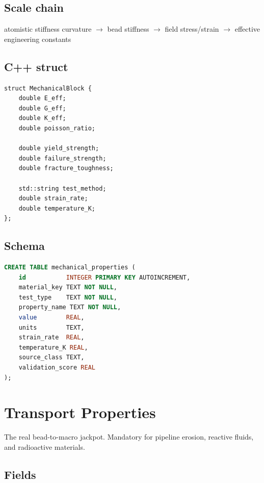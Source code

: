\documentclass[11pt, a4paper]{article}
\begin{document}
\subsection{Scale chain}

\begin{center}
atomistic stiffness curvature $\rightarrow$ bead stiffness $\rightarrow$ field stress/strain $\rightarrow$ effective engineering constants
\end{center}

\subsection{C++ struct}

\begin{lstlisting}
struct MechanicalBlock {
    double E_eff;
    double G_eff;
    double K_eff;
    double poisson_ratio;

    double yield_strength;
    double failure_strength;
    double fracture_toughness;

    std::string test_method;
    double strain_rate;
    double temperature_K;
};
\end{lstlisting}

\subsection{Schema}

\begin{lstlisting}[language=SQL]
CREATE TABLE mechanical_properties (
    id           INTEGER PRIMARY KEY AUTOINCREMENT,
    material_key TEXT NOT NULL,
    test_type    TEXT NOT NULL,
    property_name TEXT NOT NULL,
    value        REAL,
    units        TEXT,
    strain_rate  REAL,
    temperature_K REAL,
    source_class TEXT,
    validation_score REAL
);
\end{lstlisting}

\section{Transport Properties}

The real bead-to-macro jackpot. Mandatory for pipeline erosion, reactive fluids, and radioactive materials.

\subsection{Fields}
\end{document}

